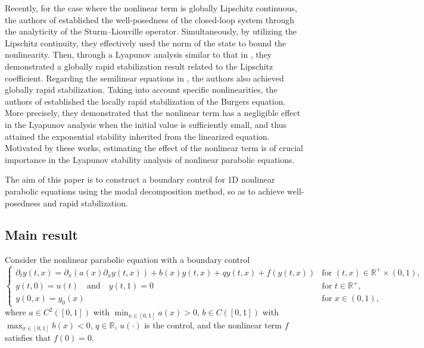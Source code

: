 \documentclass[review]{elsarticle}
\numberwithin{equation}{section}
\begin{document}
Recently, for the case where the nonlinear term is globally Lipschitz continuous, the authors of \cite{KF2,LP3} established the well-posedness of the closed-loop system through the analyticity of the Sturm–Liouville operator. Simultaneously, by utilizing the Lipschitz continuity, they effectively used the norm of the state to bound the nonlinearity. Then, through a Lyapunov analysis similar to that in \cite{CT1}, they demonstrated a globally rapid stabilization result related to the Lipschitz coefficient. Regarding the semilinear equations in \cite{KF3}, the authors also achieved globally rapid stabilization. Taking into account specific nonlinearities, the authors of \cite{LP2,PWF} established the locally rapid stabilization of the Burgers equation. More precisely, they demonstrated that the nonlinear term has a negligible effect in the Lyapunov analysis when the initial value is sufficiently small, and thus attained the exponential stability inherited from the linearized equation. Motivated by these works, estimating the effect of the nonlinear term is of crucial importance in the Lyapunov stability analysis of nonlinear parabolic equations.

The aim of this paper is to construct a boundary control for 1D nonlinear parabolic equations using the modal decomposition method, so as to achieve well-posedness and rapid stabilization.
 

\subsection{Main result}
Consider the nonlinear parabolic equation with a boundary control
\begin{equation}\label{Dirichlet-sys}
\left\{\begin{array}{ll}
 \partial_t y(t,x) =\partial_x (a(x)\partial_x y( t,x))+{b(x)}y( t,x) +qy( t,x)+f(y( t,x))&\text{for }(t,x)\in \mathbb{R}^+ \times (0,1),\\[2mm]
y(t,0)=u(t)\quad \text{and}\quad y(t,1)=0&\text{for }t\in \mathbb{R}^+,\\[2mm]
y(0,x)=y_0(x )&\text{for }x\in (0,1),
\end{array}\right.
 \end{equation}
where $a\in C^2([0,1])$ with {$\min_{x\in[0,1]}a(x)>0$}, ${b}\in C([0,1])$ with {$\max_{x\in[0,1]}b(x)< 0$}, $q\in \mathbb{R}$, $u(\cdot)$ is the control, and the nonlinear term $f$ satisfies that $f(0)=0$. 
\end{document}
